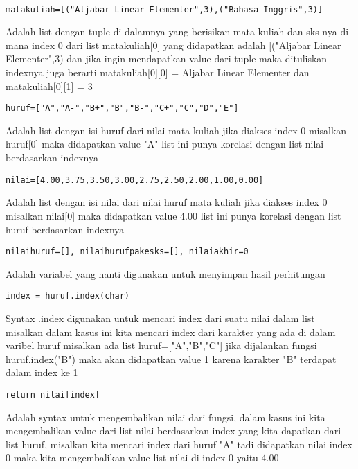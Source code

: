 \documentclass[a4paper]{article}
\begin{document}
\paragraph{}
\begin{lstlisting}
matakuliah=[("Aljabar Linear Elementer",3),("Bahasa Inggris",3)]
\end{lstlisting}
Adalah list dengan tuple di dalamnya yang berisikan mata kuliah dan sks-nya di mana index 0 dari list matakuliah[0] yang didapatkan adalah [("Aljabar Linear Elementer",3)
dan jika ingin mendapatkan value dari tuple maka dituliskan indexnya juga berarti matakuliah[0][0] = Aljabar Linear Elementer dan matakuliah[0][1] = 3

\begin{lstlisting}
huruf=["A","A-","B+","B","B-","C+","C","D","E"]
\end{lstlisting}
Adalah list dengan isi huruf dari nilai mata kuliah jika diakses index 0 misalkan huruf[0] maka didapatkan value "A" list ini punya korelasi dengan list nilai berdasarkan indexnya
\begin{lstlisting}
nilai=[4.00,3.75,3.50,3.00,2.75,2.50,2.00,1.00,0.00]
\end{lstlisting}
Adalah list dengan isi nilai dari nilai huruf mata kuliah jika diakses index 0 misalkan nilai[0] maka didapatkan value 4.00 list ini punya korelasi dengan list huruf berdasarkan indexnya
\begin{lstlisting}
nilaihuruf=[], nilaihurufpakesks=[], nilaiakhir=0
\end{lstlisting}
Adalah variabel yang nanti digunakan untuk menyimpan hasil perhitungan
\begin{lstlisting}
index = huruf.index(char)
\end{lstlisting}
Syntax .index digunakan untuk mencari index dari suatu nilai dalam list misalkan dalam kasus ini kita mencari index dari karakter yang ada di dalam varibel huruf
misalkan ada list huruf=["A","B","C"] jika dijalankan fungsi huruf.index("B") maka akan didapatkan value 1 karena karakter "B" terdapat dalam index ke 1
\begin{lstlisting}
return nilai[index]
\end{lstlisting}
Adalah syntax untuk mengembalikan nilai dari fungsi, dalam kasus ini kita mengembalikan value dari list nilai berdasarkan index yang kita dapatkan dari list huruf, misalkan kita mencari index dari huruf "A" tadi didapatkan nilai index 0 maka kita mengembalikan value list nilai di index 0 yaitu 4.00
\end{document}
